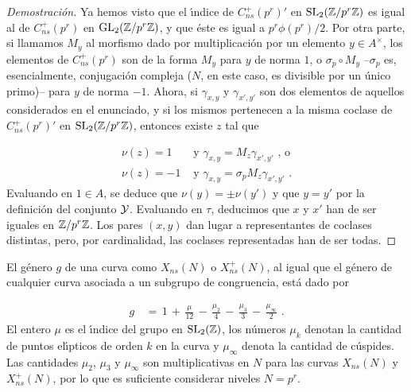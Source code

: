 \begin{proof}[Demostraci\'{o}n]
 Ya hemos visto que el \'{\i}ndice de $C_{ns}^{+}(p^{r})'$ en
 $\SL{2}(\bb{Z}/p^{r}\bb{Z})$ es igual al de $C_{ns}^{+}(p^{r})$ en
 $\GL{2}(\bb{Z}/p^{r}\bb{Z})$, y que \'{e}ste es igual a $p^{r}\phi(p^{r})/2$.
 Por otra parte, si llamamos $M_{y}$ al morfismo dado por multiplicaci\'{o}n por
 un elemento $y\in A^{\times}$, los elementos de $C_{ns}^{+}(p^{r})$ son de la
 forma $M_{y}$ para $y$ de norma $1$, o $\sigma_{p}\circ M_{y}$ --$\sigma_{p}$ es,
 esencialmente, conjugaci\'{o}n compleja ($N$, en este caso, es divisible por un
 \'{u}nico primo)-- para $y$ de norma $-1$. Ahora, si $\gamma_{x,y}$ y
 $\gamma_{x',y'}$ son dos elementos de aquellos considerados en el enunciado, y
 si los mismos pertenecen a la misma coclase de $C_{ns}^{+}(p^{r})'$ en
 $\SL{2}(\bb{Z}/p^{r}\bb{Z})$, entonces existe $z$ tal que

 \begin{align*}
  \nu(z)=1 & \text{ y }\gamma_{x,y}=M_{z}\gamma_{x',y'}\text{ , o}\\
  \nu(z)=-1 & \text{ y }\gamma_{x,y}=\sigma_{p}M_{z}\gamma_{x',y'}\text{ .}
 \end{align*}
Evaluando en $1\in A$, se deduce que $\nu(y)=\pm\nu(y')$ y que $y=y'$ por la
definici\'{o}n del conjunto $\cal{Y}$. Evaluando en $\tau$, deducimos que $x$ y
$x'$ han de ser iguales en $\bb{Z}/p^{r}\bb{Z}$. Los pares $(x,y)$ dan lugar a
representantes de coclases distintas, pero, por cardinalidad, las coclases
representadas han de ser todas.
\end{proof}
%

El g\'{e}nero $g$ de una curva como $X_{ns}(N)$ o $X_{ns}^{+}(N)$, al igual que el
g\'{e}nero de cualquier curva asociada a un subgrupo de congruencia, est\'{a}
dado por

\begin{align*}
 g & \,=\, 1\,+\,\frac{\mu}{12}\,-\,\frac{\mu_{2}}{4}
 \,-\,\frac{\mu_{3}}{3}\,-\,\frac{\mu_{\infty}}{2}\text{ .}
\end{align*}
El entero $\mu$ es el \'{\i}ndice del grupo en $\SL{2}(\bb{Z})$, los n\'{u}meros
$\mu_{k}$ denotan la cantidad de puntos el\'{\i}pticos de orden $k$ en la curva y
$\mu_{\infty}$ denota la cantidad de c\'{u}spides. Las cantidades $\mu_{2}$,
$\mu_{3}$ y $\mu_{\infty}$ son multiplicativas en $N$ para las curvas
$X_{ns}(N)$ y $X_{ns}^{+}(N)$, por lo que es suficiente considerar niveles
$N=p^{r}$.

